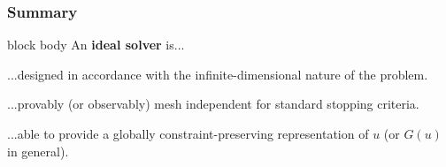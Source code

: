\documentclass[aspectratio=169,xcolor=dvipsnames,11pt]{beamer}
\begin{document}
 \begin{frame}\frametitle{Summary}
      \begin{beamercolorbox}[rounded=true, shadow=true, wd=\textwidth]{block body}
An \alert{\bf{ideal solver}} is...\medskip

...designed in accordance with the infinite-dimensional nature of the problem.\medskip

...provably (or observably) mesh independent for standard stopping criteria.\medskip

...able to provide a globally constraint-preserving representation of $u$ (or $G(u)$ in general).
 \end{beamercolorbox}
 \hfill
{}
 \end{frame}

    
    
    
    
\end{document}

